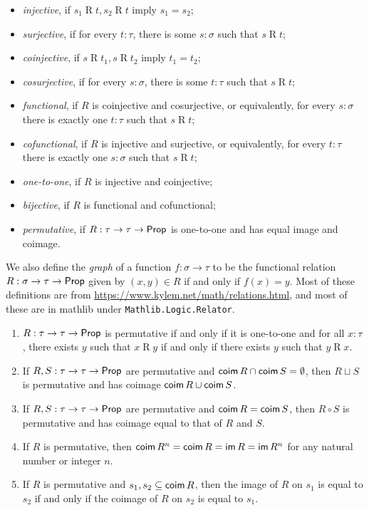 \begin{definition-no-bp}
\begin{itemize}
    \item \emph{injective}, if \( s_1 \mathrel{R} t, s_2 \mathrel{R} t \) imply \( s_1 = s_2 \);
    \item \emph{surjective}, if for every \( t : \tau \), there is some \( s : \sigma \) such that \( s \mathrel{R} t \);
    \item \emph{coinjective}, if \( s \mathrel{R} t_1, s \mathrel{R} t_2 \) imply \( t_1 = t_2 \);
    \item \emph{cosurjective}, if for every \( s : \sigma \), there is some \( t : \tau \) such that \( s \mathrel{R} t \);
    \item \emph{functional}, if \( R \) is coinjective and cosurjective, or equivalently, for every \( s : \sigma \) there is exactly one \( t : \tau \) such that \( s \mathrel{R} t \);
    \item \emph{cofunctional}, if \( R \) is injective and surjective, or equivalently, for every \( t : \tau \) there is exactly one \( s : \sigma \) such that \( s \mathrel{R} t \);
    \item \emph{one-to-one}, if \( R \) is injective and coinjective;
    \item \emph{bijective}, if \( R \) is functional and cofunctional;
    \item \emph{permutative}, if \( R : \tau \to \tau \to \mathsf{Prop} \) is one-to-one and has equal image and coimage.
  \end{itemize}
  We also define the \emph{graph} of a function \( f : \sigma \to \tau \) to be the functional relation \( R : \sigma \to \tau \to \mathsf{Prop} \) given by \( (x, y) \in R \) if and only if \( f(x) = y \).
  Most of these definitions are from \url{https://www.kylem.net/math/relations.html}, and most of these are in mathlib under \texttt{Mathlib.Logic.Relator}.
\end{definition-no-bp}
\begin{proposition-no-bp}\mbox\negthinspace
  \label{prop:relation_results}
  \begin{enumerate}
    \item \( R : \tau \to \tau \to \mathsf{Prop} \) is permutative if and only if it is one-to-one and for all \( x : \tau \), there exists \( y \) such that \( x \mathrel{R} y \) if and only if there exists \( y \) such that \( y \mathrel{R} x \).
    \item If \( R, S : \tau \to \tau \to \mathsf{Prop} \) are permutative and \( \operatorname{\mathsf{coim}} R \cap \operatorname{\mathsf{coim}} S = \emptyset \), then \( R \sqcup S \) is permutative and has coimage \( \operatorname{\mathsf{coim}} R \cup \operatorname{\mathsf{coim}} S \).
    \item If \( R, S : \tau \to \tau \to \mathsf{Prop} \) are permutative and \( \operatorname{\mathsf{coim}} R = \operatorname{\mathsf{coim}} S \), then \( R \circ S \) is permutative and has coimage equal to that of \( R \) and \( S \).
    \item If \( R \) is permutative, then \( \operatorname{\mathsf{coim}} R^n = \operatorname{\mathsf{coim}} R = \operatorname{\mathsf{im}} R = \operatorname{\mathsf{im}} R^n \) for any natural number or integer \( n \).
    \item If \( R \) is permutative and \( s_1, s_2 \subseteq \operatorname{\mathsf{coim}} R \), then the image of \( R \) on \( s_1 \) is equal to \( s_2 \) if and only if the coimage of \( R \) on \( s_2 \) is equal to \( s_1 \).
  \end{enumerate}
\end{proposition-no-bp}
